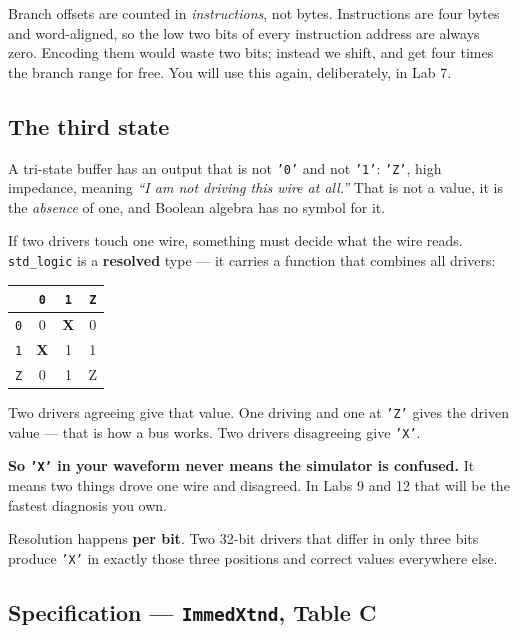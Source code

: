 \documentclass[11pt]{article}
\newcommand{\code}[1]{\texttt{#1}}
\begin{document}
Branch offsets are counted in \emph{instructions}, not bytes. Instructions are
four bytes and word-aligned, so the low two bits of every instruction address are
always zero. Encoding them would waste two bits; instead we shift, and get four
times the branch range for free. You will use this again, deliberately, in Lab 7.

\subsection*{The third state}

A tri-state buffer has an output that is not \code{'0'} and not \code{'1'}:
\code{'Z'}, high impedance, meaning \emph{``I am not driving this wire at all.''}
That is not a value, it is the \emph{absence} of one, and Boolean algebra has no
symbol for it.

If two drivers touch one wire, something must decide what the wire reads.
\code{std\_logic} is a \textbf{resolved} type --- it carries a function that
combines all drivers:

\begin{center}
\begin{tabular}{c||ccc}
\toprule
& \code{0} & \code{1} & \code{Z} \\
\midrule
\code{0} & 0 & \textbf{X} & 0 \\
\code{1} & \textbf{X} & 1 & 1 \\
\code{Z} & 0 & 1 & Z \\
\bottomrule
\end{tabular}
\end{center}

Two drivers agreeing give that value. One driving and one at \code{'Z'} gives the
driven value --- that is how a bus works. Two drivers disagreeing give \code{'X'}.

\textbf{So \code{'X'} in your waveform never means the simulator is confused.} It
means two things drove one wire and disagreed. In Labs 9 and 12 that will be the
fastest diagnosis you own.

Resolution happens \textbf{per bit}. Two 32-bit drivers that differ in only three
bits produce \code{'X'} in exactly those three positions and correct values
everywhere else.

\subsection*{Specification --- \code{ImmedXtnd}, Table C}
\end{document}
